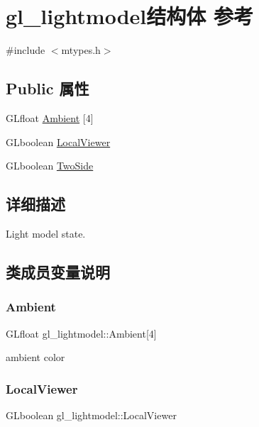 \hypertarget{structgl__lightmodel}{}\section{gl\+\_\+lightmodel结构体 参考}
\label{structgl__lightmodel}


{\ttfamily \#include $<$mtypes.\+h$>$}

\subsection*{Public 属性}
\begin{DoxyCompactItemize}
\item 
G\+Lfloat \hyperlink{structgl__lightmodel_ac1f06de9b01518c7b68cdf13a09115df}{Ambient} \mbox{[}4\mbox{]}
\item 
G\+Lboolean \hyperlink{structgl__lightmodel_a1f638dbada3c8ea24848f296fc41ab01}{Local\+Viewer}
\item 
G\+Lboolean \hyperlink{structgl__lightmodel_adf9fd2d4f67193ff77cf7812a4c33903}{Two\+Side}
\end{DoxyCompactItemize}


\subsection{详细描述}
Light model state. 

\subsection{类成员变量说明}
\mbox{\label{structgl__lightmodel_ac1f06de9b01518c7b68cdf13a09115df}} 
\subsubsection{\texorpdfstring{Ambient}{Ambient}}
{\footnotesize\ttfamily G\+Lfloat gl\+\_\+lightmodel\+::\+Ambient\mbox{[}4\mbox{]}}

ambient color \mbox{\label{structgl__lightmodel_a1f638dbada3c8ea24848f296fc41ab01}} 
\subsubsection{\texorpdfstring{Local\+Viewer}{LocalViewer}}
{\footnotesize\ttfamily G\+Lboolean gl\+\_\+lightmodel\+::\+Local\+Viewer}


